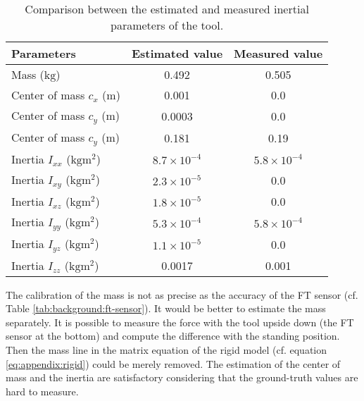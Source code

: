 \documentclass[/home/francois/latex/report/main.tex]{subfiles}
\begin{document}
\begin{table}[h]
  \begin{center}
    \renewcommand{\arraystretch}{1.2} %
    \begin{tabular}{l|c|c} %
      \textbf{Parameters} & \textbf{Estimated value} & \textbf{Measured value}\\
      \hline
      Mass ($\si{\kilogram}$)  & 0.492 & 0.505 \\
      \hline
      Center of mass $c_x$ ($\si{\meter}$)  & 0.001 & 0.0 \\
      \hline
      Center of mass $c_y$ ($\si{\meter}$)  & 0.0003 & 0.0 \\
      \hline
      Center of mass $c_y$ ($\si{\meter}$)  & 0.181 & 0.19 \\
      \hline
      Inertia $I_{xx}$ ($\si{\kilogram\meter\squared}$)  & $8.7 \times 10^{-4}$ & $5.8 \times 10^{-4}$ \\
      \hline
      Inertia $I_{xy}$ ($\si{\kilogram\meter\squared}$)  & $2.3 \times 10^{-5}$ & 0.0 \\
      \hline
      Inertia $I_{xz}$ ($\si{\kilogram\meter\squared}$)  & $1.8 \times 10^{-5}$ & 0.0 \\
      \hline
      Inertia $I_{yy}$ ($\si{\kilogram\meter\squared}$)  & $5.3 \times 10^{-4}$ & $5.8 \times 10^{-4}$ \\
      \hline
      Inertia $I_{yz}$ ($\si{\kilogram\meter\squared}$)  & $1.1 \times 10^{-5}$ & 0.0 \\
      \hline
      Inertia $I_{zz}$ ($\si{\kilogram\meter\squared}$)  & 0.0017 & 0.001 \\
      \hline
    \end{tabular}
  \end{center}
  \caption{Comparison between the estimated and measured inertial parameters of the tool.\label{tab:results:calibration-tool}}
\end{table}

The calibration of the mass is not as precise as the accuracy of the \ac{FT} sensor (cf. Table \ref{tab:background:ft-sensor}). It would be better to estimate the mass separately. It is possible to measure the force with the tool upside down (the \ac{FT} sensor at the bottom) and compute the difference with the standing position. Then the mass line in the matrix equation of the rigid model (cf. equation \ref{eq:appendix:rigid}) could be merely removed. The estimation of the center of mass and the inertia are satisfactory considering that the ground-truth values are hard to measure.
\end{document}
